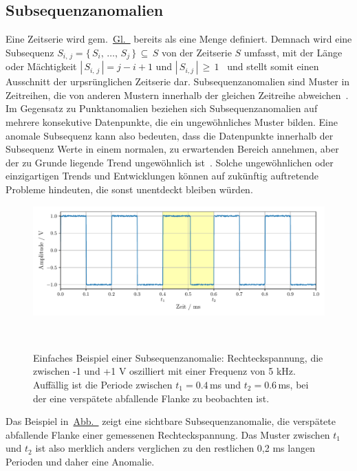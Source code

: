 \subsection{Subsequenzanomalien}

Eine Zeitserie wird gem.~\hyperref[eq:timeseries_set]{Gl.~} bereits als eine Menge definiert. Demnach wird eine
Subsequenz $S_{i,\,j} = \{\,S_i,\,\dots,\,S_j\,\}\,\subseteq\,S$ von der Zeitserie $S$ umfasst, mit der Länge oder Mächtigkeit
$|\,S_{i,\,j}\,|=j-i+1$ und $|\,S_{i,j}\,|\,\ge\,1$~\cite{Schmidl2022} und stellt somit einen Ausschnitt der urpsrünglichen Zeitserie
dar. Subsequenz\-anomalien sind Muster in Zeitreihen, die von anderen Mustern innerhalb der gleichen Zeitreihe
abweichen~\cite{Chandola2009}\Cite[S.~12]{Wenig2024}. Im Gegensatz zu Punktanomalien beziehen sich Subsequenz\-ano\-malien auf mehrere
konsekutive Datenpunkte, die ein ungewöhnliches Muster bilden. Eine anomale Subsequenz kann also bedeuten, dass die Datenpunkte innerhalb
der Subsequenz Werte in einem normalen, zu erwartenden Bereich annehmen, aber der zu Grunde liegende Trend ungewöhnlich
ist~\cite{Chandola2009}\cite[S.~17]{Boniol2021}. Solche ungewöhnlichen oder einzigartigen Trends und Entwicklungen können auf zukünftig
auftretende Probleme hindeuten, die sonst unentdeckt bleiben würden.

\begin{figure}[H]
    \centering
    \includegraphics[width=\linewidth]{ch4_anomalien/abbildungen/subsequenz_anomalie.pdf}
    \caption{\centering Einfaches Beispiel einer Subsequenzanomalie: Rechteckspannung, die zwischen -1 und +1 V oszilliert mit einer
    Frequenz von 5 kHz. Auffällig ist die Periode zwischen $t_1=0.4\,$ms und $t_2=0.6\,$ms, bei der eine verspätete abfallende Flanke zu
    beobachten ist.}
~\label{fig:subsequenz_rect}
\end{figure}

Das Beispiel in~\hyperref[fig:subsequenz_rect]{Abb.~} zeigt eine sichtbare Subsequenzanomalie, die verspätete
abfallende Flanke einer gemessenen Rechteckspannung. Das Muster zwischen $t_1$ und $t_2$ ist also merklich anders verglichen zu den
restlichen 0,2 ms langen Perioden und daher eine Anomalie.

